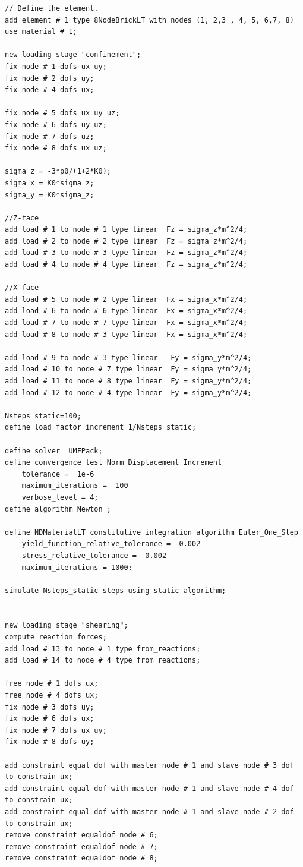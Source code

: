 \begin{lstlisting}
// Define the element.
add element # 1 type 8NodeBrickLT with nodes (1, 2,3 , 4, 5, 6,7, 8) use material # 1;

new loading stage "confinement";
fix node # 1 dofs ux uy;
fix node # 2 dofs uy;
fix node # 4 dofs ux;

fix node # 5 dofs ux uy uz;
fix node # 6 dofs uy uz;
fix node # 7 dofs uz;
fix node # 8 dofs ux uz;

sigma_z = -3*p0/(1+2*K0);
sigma_x = K0*sigma_z;
sigma_y = K0*sigma_z;

//Z-face
add load # 1 to node # 1 type linear  Fz = sigma_z*m^2/4;
add load # 2 to node # 2 type linear  Fz = sigma_z*m^2/4;
add load # 3 to node # 3 type linear  Fz = sigma_z*m^2/4;
add load # 4 to node # 4 type linear  Fz = sigma_z*m^2/4;

//X-face
add load # 5 to node # 2 type linear  Fx = sigma_x*m^2/4;
add load # 6 to node # 6 type linear  Fx = sigma_x*m^2/4;
add load # 7 to node # 7 type linear  Fx = sigma_x*m^2/4;
add load # 8 to node # 3 type linear  Fx = sigma_x*m^2/4;

add load # 9 to node # 3 type linear   Fy = sigma_y*m^2/4;
add load # 10 to node # 7 type linear  Fy = sigma_y*m^2/4;
add load # 11 to node # 8 type linear  Fy = sigma_y*m^2/4;
add load # 12 to node # 4 type linear  Fy = sigma_y*m^2/4;

Nsteps_static=100;
define load factor increment 1/Nsteps_static;

define solver  UMFPack;
define convergence test Norm_Displacement_Increment  
    tolerance =  1e-6
    maximum_iterations =  100
    verbose_level = 4;
define algorithm Newton ;

define NDMaterialLT constitutive integration algorithm Euler_One_Step
    yield_function_relative_tolerance =  0.002
    stress_relative_tolerance =  0.002
    maximum_iterations = 1000;

simulate Nsteps_static steps using static algorithm;


new loading stage "shearing";
compute reaction forces;
add load # 13 to node # 1 type from_reactions;
add load # 14 to node # 4 type from_reactions;

free node # 1 dofs ux;
free node # 4 dofs ux;
fix node # 3 dofs uy;
fix node # 6 dofs ux;
fix node # 7 dofs ux uy;
fix node # 8 dofs uy;

add constraint equal dof with master node # 1 and slave node # 3 dof to constrain ux;
add constraint equal dof with master node # 1 and slave node # 4 dof to constrain ux;
add constraint equal dof with master node # 1 and slave node # 2 dof to constrain ux;
remove constraint equaldof node # 6;
remove constraint equaldof node # 7;
remove constraint equaldof node # 8;


\end{lstlisting}
